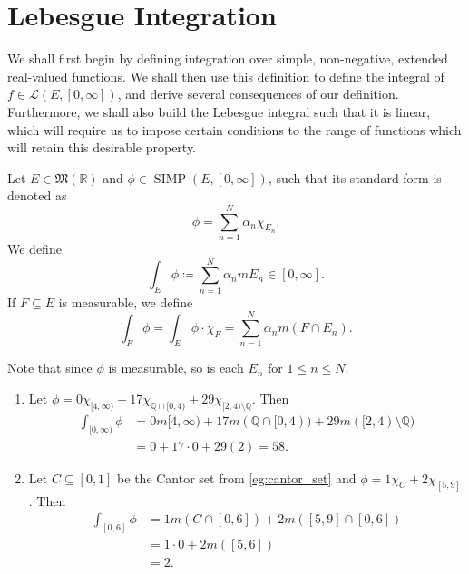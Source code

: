 \documentclass[notoc,notitlepage]{tufte-book}
\DeclareMathOperator{\SIMP}{SIMP}
\begin{document}
\section{Lebesgue Integration}%
\label{sec:lebesgue_integration}

We shall first begin by defining integration over simple, non-negative, extended
real-valued functions. We shall then use this definition to define the integral
of $f \in \mathcal{L}(E, [0, \infty])$, and derive several consequences of our
definition. Furthermore, we shall also build the Lebesgue integral such that it
is linear, which will require us to impose certain conditions to the range of
functions which will retain this desirable property.

\begin{defn}\label{defn:integration_of_simple_functions}
  Let $E \in \mathfrak{M}(\mathbb{R})$ and $\phi \in \SIMP(E, [0, \infty])$,
  such that its standard form is denoted as
  \begin{equation*} 
    \phi = \sum_{n=1}^{N} \alpha_n \chi_{E_n}.
  \end{equation*}
  We define
  \begin{equation*}
    \int_{E} \phi \coloneqq \sum_{n=1}^{N} \alpha_n m E_n \in [0, \infty].
  \end{equation*}
  If $F \subseteq E$ is measurable, we define
  \begin{equation*}
    \int_{F} \phi = \int_{E} \phi \cdot \chi_F = \sum_{n=1}^{N} \alpha_n m(F
    \cap E_n).
  \end{equation*}
\end{defn}

\begin{note}
  Note that since $\phi$ is measurable, so is each $E_n$ for $1 \leq n \leq N$.
\end{note}

\begin{eg}
  \begin{enumerate}
    \item Let $\phi = 0 \chi_{[4, \infty)} + 17 \chi_{\mathbb{Q} \cap [0, 4)} +
      29 \chi_{[2, 4) \setminus \mathbb{Q}}$. Then
      \begin{align*}
        \int_{[0, \infty)} \phi &= 0 m[4, \infty) + 17 m(\mathbb{Q} \cap [0, 4))
                                  + 29 m([2, 4) \setminus \mathbb{Q}) \\
                                &= 0 + 17 \cdot 0 + 29 (2) = 58.
      \end{align*}
    \item Let $C \subseteq [0, 1]$ be the Cantor set from \cref{eg:cantor_set}
      and $\phi = 1 \chi_C + 2 \chi_{[5, 9]}$. Then
      \begin{align*}
        \int_{[0, 6]} \phi
        &= 1 m(C \cap [0, 6]) + 2 m([5, 9] \cap [0, 6]) \\
        &= 1 \cdot 0 + 2 m([5, 6]) \\
        &= 2.
      \end{align*}
  \end{enumerate}
\end{eg}
\end{document}
